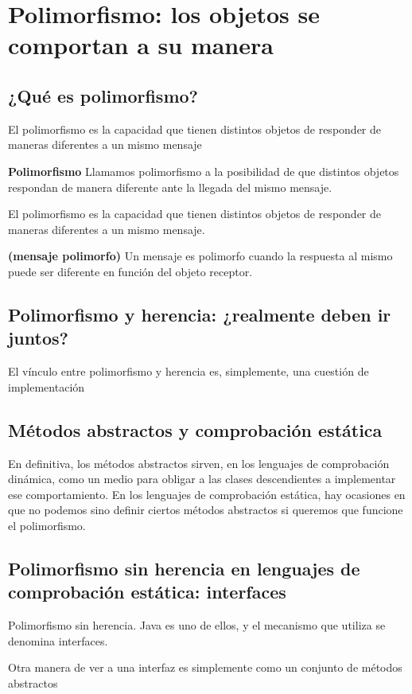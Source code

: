 \documentclass[../main.tex]{subfiles}
\begin{document}
\section{Polimorfismo: los objetos se comportan a su manera}
    \subsection{¿Qué es polimorfismo?}
        El polimorfismo es la capacidad que tienen distintos objetos de responder de maneras diferentes a un mismo mensaje

        \begin{definition} \textbf{{Polimorfismo}}
            Llamamos polimorfismo a la posibilidad de que distintos objetos respondan de manera diferente ante la llegada del mismo mensaje.
            
            El polimorfismo es la capacidad que tienen distintos objetos de responder de maneras diferentes a un mismo mensaje.
        \end{definition}

        \begin{definition} \textbf{(mensaje polimorfo)}
            Un mensaje es polimorfo cuando la respuesta al mismo puede ser diferente en función del objeto receptor.
        \end{definition}

    \subsection{Polimorfismo y herencia: ¿realmente deben ir juntos?}
        El vínculo entre polimorfismo y herencia es, simplemente, una cuestión de implementación

    \subsection{Métodos abstractos y comprobación estática}
        En definitiva, los métodos abstractos sirven, en los lenguajes de comprobación dinámica, como un medio para obligar a las clases descendientes a implementar ese comportamiento. En los lenguajes de comprobación estática, hay ocasiones en que no podemos sino definir ciertos métodos abstractos si queremos que funcione el polimorfismo.

    \subsection{Polimorfismo sin herencia en lenguajes de comprobación estática: interfaces}
    Polimorfismo sin herencia. Java es uno de ellos, y el mecanismo que utiliza se denomina interfaces.

    Otra manera de ver a una interfaz es simplemente como un conjunto de métodos abstractos
\end{document}
